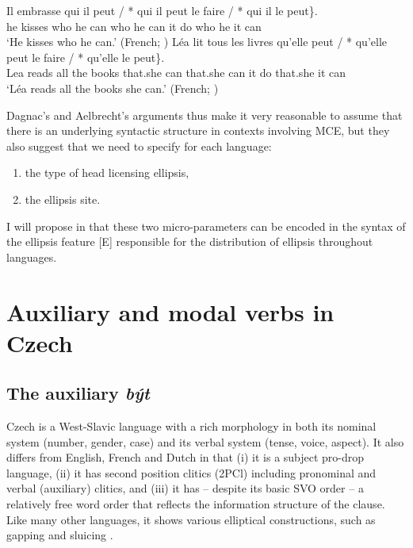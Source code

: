 \documentclass[output=paper,colorlinks,citecolor=brown,
modfonts
]{langscibook}
\begin{document}
\begin{exe}
\ex \label{10}
\begin{xlist}
\ex \label{10a} 
\gll Il embrasse \minsp{\{} qui il peut / *\hspace{-2pt} qui  il  peut  le faire / *\hspace{-2pt} qui  il   le peut\}.\\
he kisses {} who he can  {}  {} who he can it do {}  {} who he it can \\
\glt `He kisses who he can.' \hfill (French; \citealt{Dagnac2008})
\ex \label{10b} 
\gll  Léa lit tous les livres  \minsp{\{} qu'elle peut / *\hspace{-2pt} qu'elle  peut le faire\hspace{20pt}  / *\hspace{-2pt} qu'elle le peut\}. \\
 Lea reads all the books {} {that.she} can {} {} {that.she} can it do {} {} {that.she} it can {}\\
\glt `Léa reads all the books she can.' \hfill (French; \citealt{Dagnac2008})
\end{xlist}
\end{exe}


\noindent Dagnac's and Aelbrecht's arguments thus make it very reasonable to assume that there is an underlying syntactic structure in contexts involving MCE, but they also suggest that we need to specify for each language:
\begin{enumerate}
    \item the type of head licensing ellipsis,
    \item the ellipsis site.
\end{enumerate} 
I will propose in  that these two micro-parameters can be encoded in the syntax of the ellipsis feature [E] responsible for the distribution of ellipsis throughout languages. 


\section{Auxiliary and modal verbs in Czech}\label{sec:3}


\subsection{The auxiliary \textit{být}}\label{sec:3.1}

Czech is a West-Slavic language with a rich morphology in both its nominal system (number, gender, case) and its verbal system (tense, voice, aspect). It also differs from English, French and Dutch in that (i) it is a subject pro-drop language, (ii) it has second position clitics (2PCl) including pronominal and verbal (auxiliary) clitics, and (iii) it has -- despite its basic SVO order -- a relatively free word order that reflects the information structure of the clause. Like many other languages, it shows various elliptical constructions, such as gapping and sluicing \citep{Gruet-Skrabalova2016}.
\end{document}
